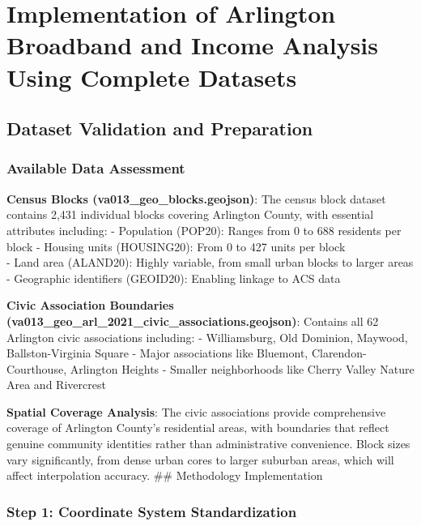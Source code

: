 \documentclass[
  letterpaper,
  DIV=11,
  numbers=noendperiod]{scrartcl}
\begin{document}
\section{Implementation of Arlington Broadband and Income Analysis Using
Complete
Datasets}\label{implementation-of-arlington-broadband-and-income-analysis-using-complete-datasets}

\subsection{Dataset Validation and
Preparation}\label{dataset-validation-and-preparation}

\subsubsection{Available Data
Assessment}\label{available-data-assessment}

\textbf{Census Blocks (va013\_geo\_blocks.geojson)}: The census block
dataset contains 2,431 individual blocks covering Arlington County, with
essential attributes including: - Population (POP20): Ranges from 0 to
688 residents per block - Housing units (HOUSING20): From 0 to 427 units
per block\\
- Land area (ALAND20): Highly variable, from small urban blocks to
larger areas - Geographic identifiers (GEOID20): Enabling linkage to ACS
data

\textbf{Civic Association Boundaries
(va013\_geo\_arl\_2021\_civic\_associations.geojson)}: Contains all 62
Arlington civic associations including: - Williamsburg, Old Dominion,
Maywood, Ballston-Virginia Square - Major associations like Bluemont,
Clarendon-Courthouse, Arlington Heights - Smaller neighborhoods like
Cherry Valley Nature Area and Rivercrest

\textbf{Spatial Coverage Analysis}: The civic associations provide
comprehensive coverage of Arlington County's residential areas, with
boundaries that reflect genuine community identities rather than
administrative convenience. Block sizes vary significantly, from dense
urban cores to larger suburban areas, which will affect interpolation
accuracy. \#\# Methodology Implementation

\subsubsection{Step 1: Coordinate System
Standardization}\label{step-1-coordinate-system-standardization}
\end{document}
